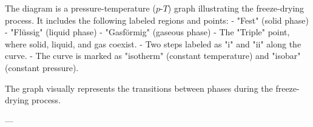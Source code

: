The diagram is a pressure-temperature (\(p\)-\(T\)) graph illustrating the freeze-drying process. It includes the following labeled regions and points:  
- "Fest" (solid phase)  
- "Flüssig" (liquid phase)  
- "Gasförmig" (gaseous phase)  
- The "Triple" point, where solid, liquid, and gas coexist.  
- Two steps labeled as "i" and "ii" along the curve.  
- The curve is marked as "isotherm" (constant temperature) and "isobar" (constant pressure).  

The graph visually represents the transitions between phases during the freeze-drying process.

---